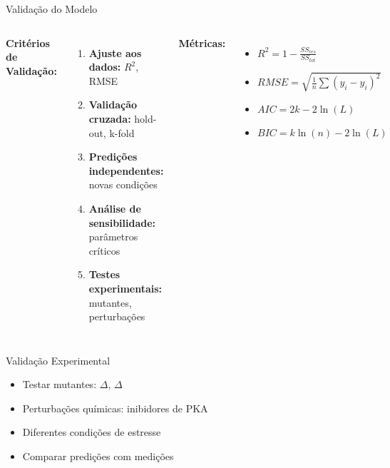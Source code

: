 \begin{frame}{Validação do Modelo}
\begin{columns}
\textbf{Critérios de Validação:}
\begin{enumerate}
    \item \textbf{Ajuste aos dados:} $R^2$, RMSE
    \item \textbf{Validação cruzada:} hold-out, k-fold
    \item \textbf{Predições independentes:} novas condições
    \item \textbf{Análise de sensibilidade:} parâmetros críticos
    \item \textbf{Testes experimentais:} mutantes, perturbações
\end{enumerate}

\textbf{Métricas:}
\begin{itemize}
    \item $R^2 = 1 - \frac{SS_{res}}{SS_{tot}}$
    \item $RMSE = \sqrt{\frac{1}{n}\sum(y_i - \hat{y}_i)^2}$
    \item $AIC = 2k - 2\ln(L)$
    \item $BIC = k\ln(n) - 2\ln(L)$
\end{itemize}
\end{columns}

\vspace{0.3cm}

\begin{exampleblock}{Validação Experimental}
\begin{itemize}
    \item Testar mutantes: $\Delta$, $\Delta$
    \item Perturbações químicas: inibidores de PKA
    \item Diferentes condições de estresse
    \item Comparar predições com medições
\end{itemize}
\end{exampleblock}
\end{frame}

